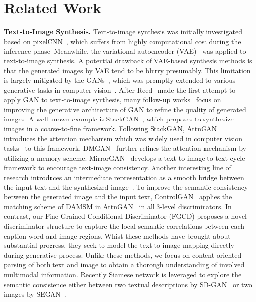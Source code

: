\documentclass[runningheads]{llncs}
\begin{document}
\section{Related Work}
\smallskip\noindent\textbf{Text-to-Image Synthesis.}
Text-to-image synthesis was initially investigated based on pixelCNN~\cite{reed2017parallel,Reed2017structure}, which suffers from highly computational cost during the inference phase. Meanwhile, the variational autoencoder (VAE)~\cite{mansimov2015generating} was applied to text-to-image synthesis. 
A potential drawback of VAE-based synthesis methods is that the generated images by VAE tend to be blurry presumably. This limitation is largely mitigated by the GANs~\cite{Goodfellow2014Generative}, which was promptly extended to various generative tasks in computer vision~\cite{Brock2018Large,isola2017image,miyato2018spectral,zhang2018self,zhu2017unpaired,niu2019pathological,cao2019makeup,liu2020separate,liu2020unsupervised}.
After Reed~\cite{reed2016generative} made the first attempt to apply GAN to text-to-image synthesis, many follow-up works~\cite{hinz2019semantic,hong2018inferring,li2019object,qiao2019mirrorgan,xu2018attngan,zhang2017stackgan,Han2017StackGAN,zhu2019dm-gan:} focus on improving the generative architecture of GAN to refine the quality of generated images. A well-known example is StackGAN~\cite{zhang2017stackgan,Han2017StackGAN}, which proposes to synthesize images in a coarse-to-fine framework. Following StackGAN, AttnGAN~\cite{xu2018attngan} introduces the attention mechanism which was widely used in computer vision tasks~\cite{yu2019see,lv2019attention} to this framework. DMGAN~\cite{zhu2019dm-gan:} further refines the attention mechanism by utilizing a memory scheme. MirrorGAN~\cite{qiao2019mirrorgan} develops a text-to-image-to-text cycle framework to encourage text-image consistency. Another interesting line of research introduces an intermediate representation as a smooth bridge between the input text and the synthesized image~\cite{hinz2019semantic,hong2018inferring,li2019object,yuan2019bridge}. 
To improve the semantic consistency between the generated image and the input text, ControlGAN~\cite{li2019controllable} applies
the matching scheme of DAMSM in AttnGAN~\cite{xu2018attngan} in all
3-level discriminators. In contrast, our Fine-Grained Conditional Discriminator (FGCD) proposes a novel discriminator structure to capture the local semantic correlations between each caption word and image regions.
Whist these methods have brought about substantial progress, they seek to model the text-to-image mapping directly during generative process. Unlike these methods, we focus on content-oriented parsing of both text and image to obtain a thorough understanding of involved multimodal information. Recently Siamese network is leveraged to explore the semantic consistence either between two textual descriptions by SD-GAN~\cite{yin2019semantics} or two images by SEGAN~\cite{Hong2019semantics-enhanced-augmented}. 
\end{document}
